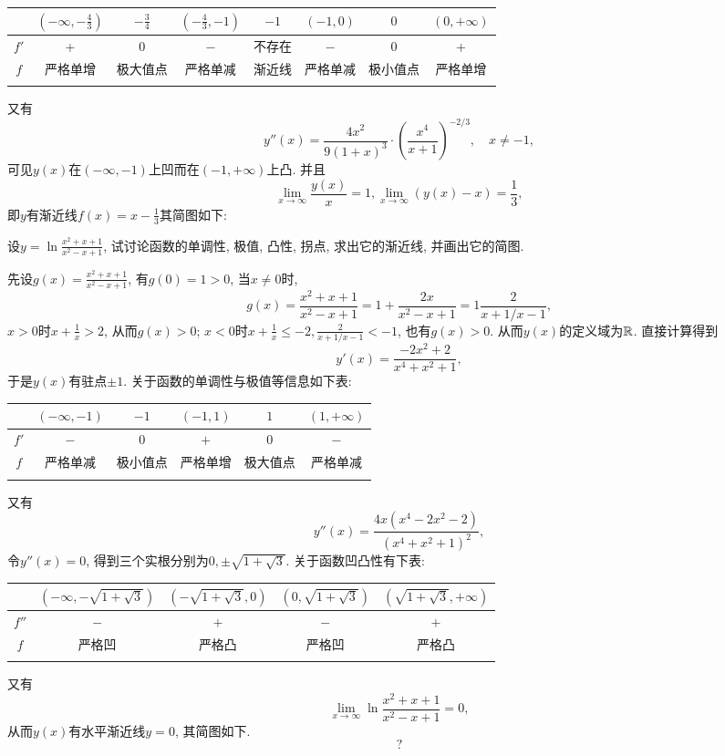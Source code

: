 \begin{quiza}
\begin{solution}
\begin{center}
\begin{tabular}{c|c|c|c|c|c|c|c}
\Xhline{1.2pt}
\phantom{\Large\(\int\)}&\(\left(-\infty,-\frac{4}{3}\right)\)&\(-\frac{3}{4}\)&\(\left(-\frac{4}{3},-1\right)\)&\(-1\)&\(\left(-1,0\right)\)&\(0\)&\(\left(0,+\infty\right)\)\\\hline
\(f'\)&+&0&\(-\)&不存在&\(-\)&0&+\\\hline
\(f\)&严格单增&极大值点&严格单减&渐近线&严格单减&极小值点&严格单增\\\Xhline{1.2pt}
\end{tabular}
\end{center}
又有\[y''(x)=\frac{4x^2}{9(1+x)^3}\cdot\left(\frac{x^4}{x+1}\right)^{-2/3},\quad x\ne -1,\]可见\(y(x)\)在\((-\infty,-1)\)上凹而在\((-1,+\infty)\)上凸. 并且\[\lim_{x\rightarrow\infty}\frac{y(x)}{x}=1,\lim_{x\rightarrow\infty}\left(y(x)-x\right)=\frac{1}{3},\]即\(y\)有渐近线\(f(x)=x-\frac{1}{3}\)其简图如下:
\end{solution}
\woe 设\(y=\ln\frac{x^2+x+1}{x^2-x+1}\), 试讨论函数的单调性, 极值, 凸性, 拐点, 求出它的渐近线, 并画出它的简图.
\begin{solution}
先设\(g(x)=\frac{x^2+x+1}{x^2-x+1}\), 有\(g(0)=1>0\), 当\(x\ne 0\)时, \[g(x)=\frac{x^2+x+1}{x^2-x+1}=1+\frac{2x}{x^2-x+1}=1\frac{2}{x+1/x-1},\]\(x>0\)时\(x+\frac{1}{x}>2\), 从而\(g(x)>0\); \(x<0\)时\(x+\frac{1}{x}\leqslant -2,\frac{2}{x+1/x-1}<-1\), 也有\(g(x)>0\). 从而\(y(x)\)的定义域为\(\mathbb{R}\). 直接计算得到\[y'(x)=\frac{-2x^2+2}{x^4+x^2+1},\]于是\(y(x)\)有驻点\(\pm1\). 关于函数的单调性与极值等信息如下表:
\begin{center}
\begin{tabular}{c|c|c|c|c|c}
\Xhline{1.2pt}
&\(\left(-\infty,-1\right)\)&\(-1\)&\(\left(-1,1\right)\)&\(1\)&\(\left(1,+\infty\right)\)\\\hline
\(f'\)&\(-\)&0&\(+\)&0&\(-\)\\\hline
\(f\)&严格单减&极小值点&严格单增&极大值点&严格单减\\\Xhline{1.2pt}
\end{tabular}
\end{center}
\noindent
又有\[y''(x)=\frac{4x(x^4-2x^2-2)}{(x^4+x^2+1)^2},\]令\(y''(x)=0\), 得到三个实根分别为\(0,\pm\sqrt{1+\sqrt{3}}\). 关于函数凹凸性有下表:
\begin{center}
\begin{tabular}{c|c|c|c|c}
\Xhline{1.2pt}
\phantom{\Large\(\int\)}&\(\left(-\infty,-\sqrt{1+\sqrt{3}}\right)\)&\(\left(-\sqrt{1+\sqrt{3}},0\right)\)&\(\left(0,\sqrt{1+\sqrt{3}}\right)\)&\(\left(\sqrt{1+\sqrt{3}},+\infty\right)\)\\\hline
\(f''\)&\(-\)&\(+\)&\(-\)&\(+\)\\\hline
\(f\)&严格凹&严格凸&严格凹&严格凸\\\Xhline{1.2pt}
\end{tabular}
\end{center}
\noindent
 又有\[\lim_{x\rightarrow\infty}\ln\frac{x^2+x+1}{x^2-x+1}=0,\]从而\(y(x)\)有水平渐近线\(y=0\), 其简图如下.\[?\]
\end{solution}
\end{quiza}
